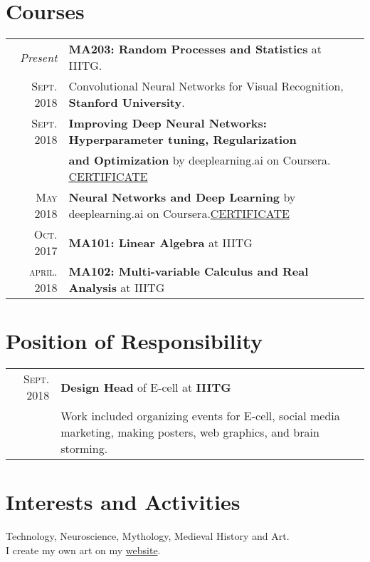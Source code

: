 \documentclass[a4paper,5pt]{article}
\begin{document}
\section{Courses}
\begin{tabular}{rl}
\textit{Present}  & \textbf{MA203: Random Processes and Statistics} at IIITG.
\vspace{0.0625cm}\\
\textsc{Sept.} 2018 & Convolutional Neural Networks for Visual Recognition, \textbf{Stanford University}.
\vspace{0.0625cm}\\
\textsc{Sept.} 2018 & \textbf{Improving Deep Neural Networks: Hyperparameter tuning, Regularization }\\
& \textbf{and Optimization} by deeplearning.ai on Coursera. \footnotesize{\href{https://www.coursera.org/account/accomplishments/certificate/7EUJX4WNZYFU}{ CERTIFICATE}}
\vspace{0.0625cm}\\
\textsc{May} 2018 & \textbf{Neural Networks and Deep Learning} by deeplearning.ai on Coursera.\footnotesize{\href{https://www.coursera.org/account/accomplishments/certificate/NQD4P6ERR659}{CERTIFICATE}}
\vspace{0.0625cm}\\
\textsc{Oct.} 2017 & \textbf{MA101: Linear Algebra} at IIITG
\vspace{0.0625cm}\\
\textsc{april.} 2018 & \textbf{MA102: Multi-variable Calculus and Real Analysis} at
IIITG\\

\end{tabular}

\section{Position of Responsibility}
\begin{tabular}{r|p{11cm}}
 \textsc{Sept.} 2018 & \textbf{Design Head} of E-cell at \textbf{IIITG}\\
 &\footnotesize{ Work included organizing events for E-cell, social media marketing, making posters, web graphics, and brain storming.}\\
\end{tabular}

\section{Interests and Activities}
Technology, Neuroscience, Mythology, Medieval History and Art.\\
I create my own art on my \href{https://sites.google.com/view/rishabhbaghel/art}{website}.
\end{document}
